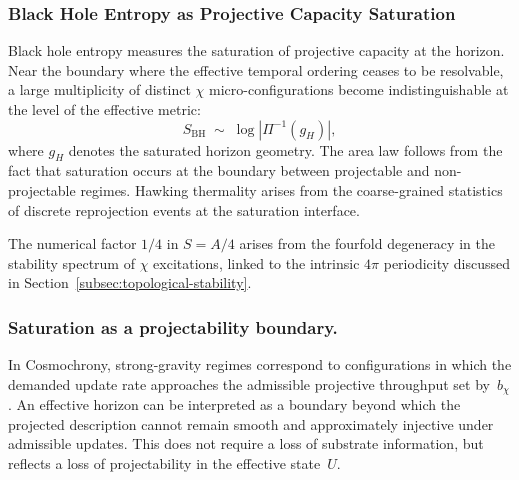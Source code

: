   \subsubsection*{Black Hole Entropy as Projective Capacity Saturation}
    \label{subsec:bh-entropy-relaxation}

    Black hole entropy measures the saturation of projective capacity at the
    horizon.
    Near the boundary where the effective temporal ordering ceases to be
    resolvable, a large multiplicity of distinct $\chi$ micro-configurations
    become indistinguishable at the level of the effective metric:
    \begin{equation}
      S_{\mathrm{BH}} \;\sim\;
      \log \left| \Pi^{-1}(g_H) \right|,
    \end{equation}
    where $g_H$ denotes the saturated horizon geometry.
    The area law follows from the fact that saturation occurs at the
    boundary between projectable and non-projectable regimes.
    Hawking thermality arises from the coarse-grained statistics of discrete
    reprojection events at the saturation interface.

    The numerical factor $1/4$ in $S = A/4$ arises from the fourfold
    degeneracy in the stability spectrum of $\chi$ excitations, linked to
    the intrinsic $4\pi$ periodicity discussed in
    Section~\ref{subsec:topological-stability}.

  \subsubsection*{Saturation as a projectability boundary.}
    In Cosmochrony, strong-gravity regimes correspond to configurations in which the demanded update rate approaches
    the admissible projective throughput set by~$b_{\chi}$.
    An effective horizon can be interpreted as a boundary beyond which the projected description cannot remain smooth
    and approximately injective under admissible updates.
    This does not require a loss of substrate information, but reflects a loss of projectability in the effective
    state~$U$.

